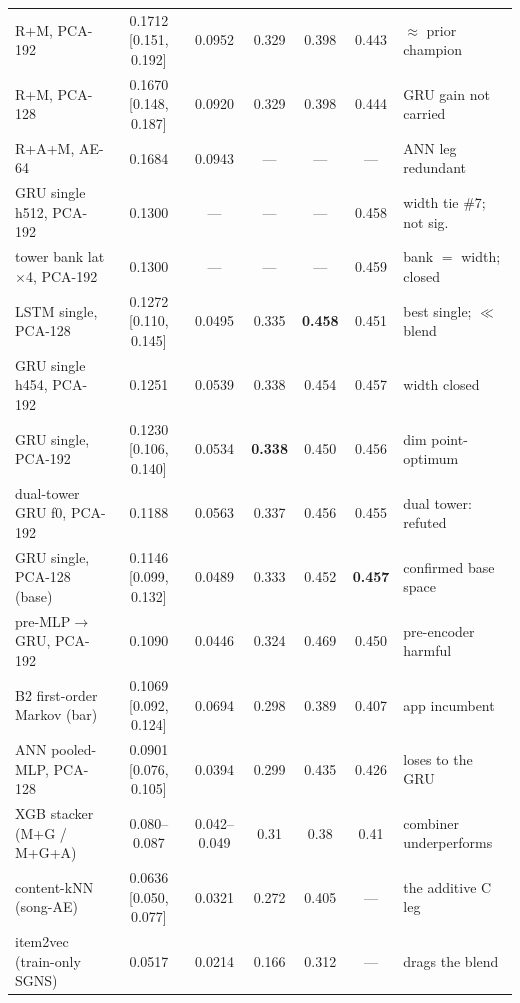 \documentclass[11pt]{article}
\newcommand{\best}[1]{\textbf{#1}}
\begin{document}
\begin{table}[ht]
{\begin{tabular}{lcccccl}
    R+M, PCA-192                          & 0.1712 [0.151, 0.192] & 0.0952 & 0.329 & 0.398 & 0.443 & $\approx$ prior champion \\
    R+M, PCA-128                          & 0.1670 [0.148, 0.187] & 0.0920 & 0.329 & 0.398 & 0.444 & GRU gain not carried \\
    R+A+M, AE-64                          & 0.1684 & 0.0943 & --- & --- & --- & ANN leg redundant \\
    GRU single h512, PCA-192          & 0.1300 & --- & --- & --- & 0.458 & width tie \#7; not sig.\ \\
    tower bank lat$\times$4, PCA-192   & 0.1300 & --- & --- & --- & 0.459 & bank $=$ width; closed \\
    LSTM single, PCA-128                  & 0.1272 [0.110, 0.145] & 0.0495 & 0.335 & \best{0.458} & 0.451 & best single; $\ll$ blend \\
    GRU single h454, PCA-192          & 0.1251 & 0.0539 & 0.338 & 0.454 & 0.457 & width closed \\
    GRU single, PCA-192                   & 0.1230 [0.106, 0.140] & 0.0534 & \best{0.338} & 0.450 & 0.456 & dim point-optimum \\
    dual-tower GRU f0, PCA-192        & 0.1188 & 0.0563 & 0.337 & 0.456 & 0.455 & dual tower: refuted \\
    GRU single, PCA-128 (base)            & 0.1146 [0.099, 0.132] & 0.0489 & 0.333 & 0.452 & \best{0.457} & confirmed base space \\
    pre-MLP$\to$GRU, PCA-192          & 0.1090 & 0.0446 & 0.324 & 0.469 & 0.450 & pre-encoder harmful \\
    B2 first-order Markov (bar)           & 0.1069 [0.092, 0.124] & 0.0694 & 0.298 & 0.389 & 0.407 & app incumbent \\
    ANN pooled-MLP, PCA-128               & 0.0901 [0.076, 0.105] & 0.0394 & 0.299 & 0.435 & 0.426 & loses to the GRU \\
    XGB stacker (M+G / M+G+A)             & 0.080--0.087 & 0.042--0.049 & 0.31 & 0.38 & 0.41 & combiner underperforms \\
    content-kNN (song-AE)                 & 0.0636 [0.050, 0.077] & 0.0321 & 0.272 & 0.405 & --- & the additive C leg \\
    item2vec (train-only SGNS)            & 0.0517 & 0.0214 & 0.166 & 0.312 & --- & drags the blend \\
    \bottomrule
  \end{tabular}}
\end{table}
\end{document}
